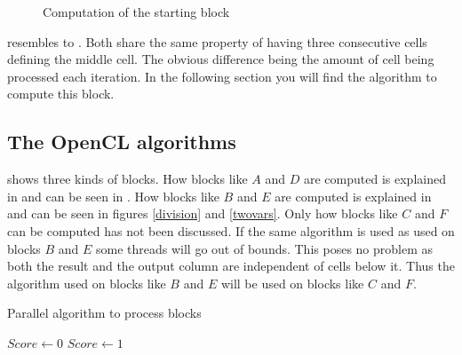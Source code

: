 \begin{figure}
    \centering
    
    \caption{Computation of the starting block} \label{start}
\end{figure}

 resembles to .
Both share the same property of having three consecutive cells defining the middle cell.
The obvious difference being the amount of cell being processed each iteration.
In the following section you will find the algorithm to compute this block.

\subsection{The OpenCL algorithms} \label{algorithms}
 shows three kinds of blocks.
How blocks like $A$ and $D$ are computed is explained in  and can be seen in .
How blocks like $B$ and $E$ are computed is explained in  and can be seen in figures \ref{division} and \ref{twovars}.
Only how blocks like $C$ and $F$ can be computed has not been discussed.
If the same algorithm is used as used on blocks $B$ and $E$ some threads will go out of bounds.
This poses no problem as both the result and the output column are independent of cells below it.
Thus the algorithm used on blocks like $B$ and $E$ will be used on blocks like $C$ and $F$.

\begin{algorithm}
\caption{Parallel algorithm to process blocks} \label{block}
\begin{algorithmic}[1]
    \Statex
        \Statex
            \State $Score \gets 0$
        \Else
            \State $Score \gets 1$
        \EndIf
        \Statex
        \Statex
        \Statex
    \EndFor
\EndProcedure
\end{algorithmic}
\end{algorithm}

